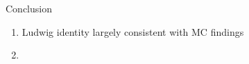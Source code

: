 \begin{frame}{Conclusion}
    \begin{enumerate}
        \item Ludwig identity largely consistent with MC findings
        \item 
    \end{enumerate}


\end{frame}
